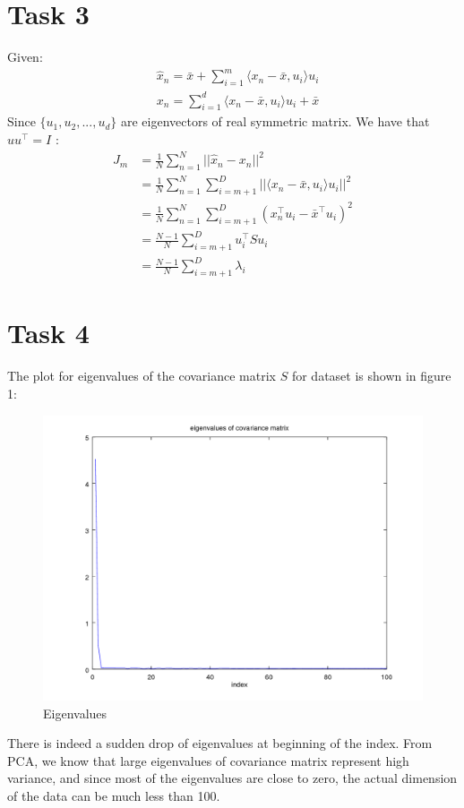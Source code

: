 \documentclass[11pt]{article}
\theoremstyle{plain}
\theoremstyle{definition}
\begin{document}
\section{Task 3}
Given: \begin{align*}
& \hat{x}_n = \bar{x} + \sum\limits_{i=1}^{m} \langle x_n - \bar{x} , u_i \rangle u_i \\
& x_n = \sum\limits_{i=1}^{d} \langle x_n - \bar{x} , u_i  \rangle u_i + \bar{x}
\end{align*}
Since $\{ u_1, u_2, ..., u_d \}$ are eigenvectors of real symmetric matrix. We have that $uu^\top = I$ : \begin{align*}
J_m &= \frac{1}{N} \sum\limits_{n=1}^{N} || \hat{x}_n - x_n || ^2 \\
&= \frac{1}{N} \sum\limits_{n=1}^{N} \sum\limits_{i=m+1}^{D} ||\langle x_n - \bar{x} , u_i \rangle u_i||^2  \\
&= \frac{1}{N} \sum\limits_{n=1}^{N} \sum\limits_{i=m+1}^{D} (x^\top_n u_i - \bar{x}^\top u_i)^2 \\&= \frac{N-1}{N}\sum\limits_{i=m+1}^{D} u_i^\top S u_i\\ &= \frac{N-1}{N}\sum\limits_{i=m+1}^{D} \lambda_i 
\end{align*}


\section{Task 4}
The plot for eigenvalues of the covariance matrix $S$ for dataset is shown in figure 1: 
\begin{figure}
  \centering 
  \includegraphics[width=.5\linewidth]{Task4.png}
  \caption{Eigenvalues}
  \label{fig:Eigenvalues}
\end{figure}
There is indeed a sudden drop of eigenvalues at beginning of the index. From PCA, we know that large eigenvalues of covariance matrix represent high variance, and since most of the eigenvalues are close to zero, the actual dimension of the data can be much less than 100. 
\end{document}
